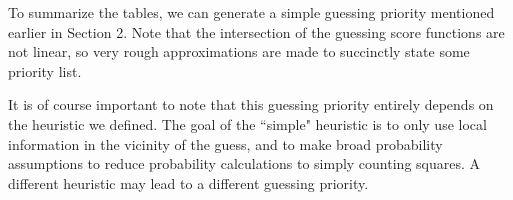 To summarize the tables, we can generate a simple guessing priority mentioned earlier in Section 2. Note that the intersection of the guessing score functions are not linear, so very rough approximations are made to succinctly state some priority list.\\


It is of course important to note that this guessing priority entirely depends on the heuristic we defined. The goal of the ``simple" heuristic is to only use local information in the vicinity of the guess, and to make broad probability assumptions to reduce probability calculations to simply counting squares. A different heuristic may lead to a different guessing priority.